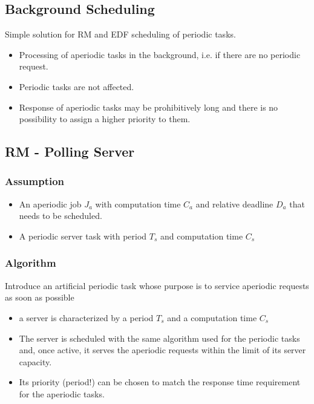 \subsection{Background Scheduling}
Simple solution
for RM and EDF scheduling of periodic 
tasks.
\begin{itemize}[noitemsep]
\item Processing of aperiodic tasks in the background, i.e. if there 
are no periodic request.
\item Periodic tasks are not affected.
\item Response of aperiodic tasks may be prohibitively long and 
there is no possibility to assign a higher priority to them.

\end{itemize}


\subsection{RM - Polling Server}

\subsubsection{Assumption}

\begin{itemize}[noitemsep]
\item An aperiodic job $J_a$ with computation time $C_a$ and relative deadline $D_a$ that needs to be scheduled.
\item A periodic server task with period $T_s$ and computation time $C_s$
\end{itemize}

\subsubsection{Algorithm}
Introduce an artificial periodic task whose purpose is to service aperiodic requests as soon as possible
\begin{itemize}[noitemsep]
\item a server is characterized by a period $T_s$ and a computation time $C_s$
\item The server is scheduled with the same algorithm used for the 
periodic tasks and, once active, it serves the aperiodic 
requests within the limit of its server capacity.
\item Its priority (period!) can be chosen to match the response 
time requirement for the aperiodic tasks.
\end{itemize}


